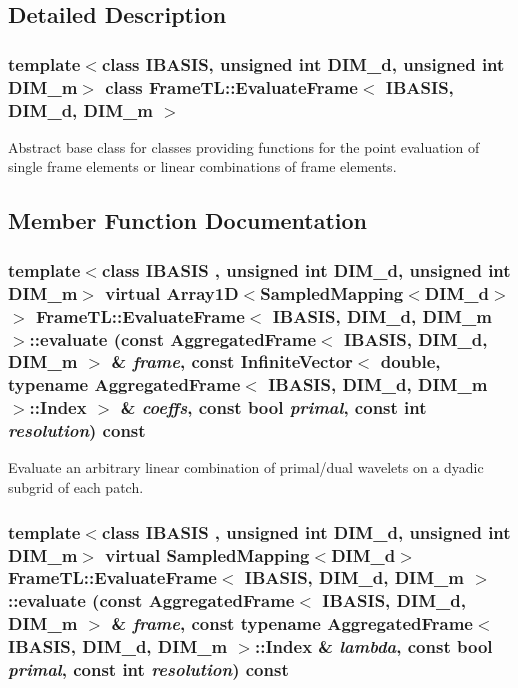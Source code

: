 \begin{CompactItemize}
\end{CompactItemize}


\subsection{Detailed Description}
\subsubsection*{template$<$class IBASIS, unsigned int DIM\_\-d, unsigned int DIM\_\-m$>$ class FrameTL::EvaluateFrame$<$ IBASIS, DIM\_\-d, DIM\_\-m $>$}

Abstract base class for classes providing functions for the point evaluation of single frame elements or linear combinations of frame elements. 

\subsection{Member Function Documentation}
\hypertarget{classFrameTL_1_1EvaluateFrame_e7bdc20b6e85b3c4a81511a234040467}{
\subsubsection[{evaluate}]{\setlength{\rightskip}{0pt plus 5cm}template$<$class IBASIS , unsigned int DIM\_\-d, unsigned int DIM\_\-m$>$ virtual Array1D$<$SampledMapping$<$DIM\_\-d$>$ $>$ {\bf FrameTL::EvaluateFrame}$<$ IBASIS, DIM\_\-d, DIM\_\-m $>$::evaluate (const {\bf AggregatedFrame}$<$ IBASIS, DIM\_\-d, DIM\_\-m $>$ \& {\em frame}, \/  const InfiniteVector$<$ double, typename {\bf AggregatedFrame}$<$ IBASIS, DIM\_\-d, DIM\_\-m $>$::Index $>$ \& {\em coeffs}, \/  const bool {\em primal}, \/  const int {\em resolution}) const}}
\label{classFrameTL_1_1EvaluateFrame_e7bdc20b6e85b3c4a81511a234040467}


Evaluate an arbitrary linear combination of primal/dual wavelets on a dyadic subgrid of each patch. \hypertarget{classFrameTL_1_1EvaluateFrame_3315369302b4dfb8e73a7dae1658fc20}{
\subsubsection[{evaluate}]{\setlength{\rightskip}{0pt plus 5cm}template$<$class IBASIS , unsigned int DIM\_\-d, unsigned int DIM\_\-m$>$ virtual SampledMapping$<$DIM\_\-d$>$ {\bf FrameTL::EvaluateFrame}$<$ IBASIS, DIM\_\-d, DIM\_\-m $>$::evaluate (const {\bf AggregatedFrame}$<$ IBASIS, DIM\_\-d, DIM\_\-m $>$ \& {\em frame}, \/  const typename {\bf AggregatedFrame}$<$ IBASIS, DIM\_\-d, DIM\_\-m $>$::Index \& {\em lambda}, \/  const bool {\em primal}, \/  const int {\em resolution}) const}}
\label{classFrameTL_1_1EvaluateFrame_3315369302b4dfb8e73a7dae1658fc20}


